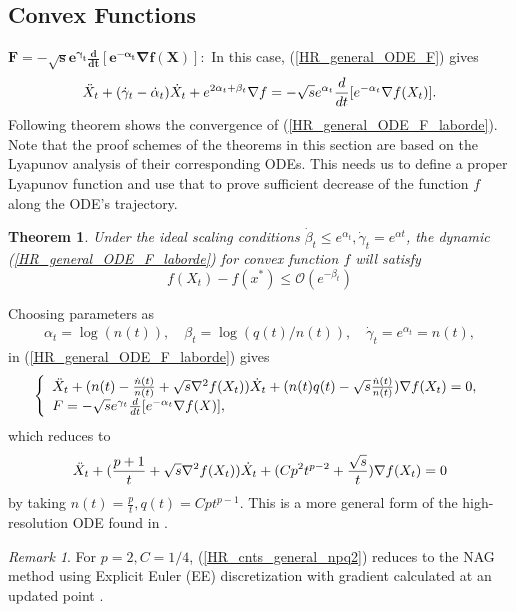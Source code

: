 \documentclass{article}
\theoremstyle{plain}
\newtheorem{theorem}{Theorem}[section]
\theoremstyle{definition}
\theoremstyle{remark}
\newtheorem{remark}{Remark}[theorem]
\begin{document}
\subsection{Convex Functions}
$\boldsymbol {F = -\sqrt{s}e^{\gamma_t}\frac{d}{dt}[e^{-\alpha_t}\nabla f(X)]}:$ 
    In this case, (\ref{HR_general_ODE_F}) gives
    \begin{align}\label{HR_general_ODE_F_laborde}
    \Ddot{X}_t + (\dot{\gamma}_t-\dot{\alpha}_t)\dot{X}_t+e^{2\alpha_t+\beta_t}\nabla f = -\sqrt{s}e^{\alpha_t}\frac{d}{dt}[e^{-\alpha_t}\nabla f(X_t)].
\end{align}
Following theorem shows the convergence of (\ref{HR_general_ODE_F_laborde}). Note that the proof schemes of the theorems in this section are based on the Lyapunov analysis of their corresponding ODEs. This needs us to define a proper Lyapunov function and use that to prove sufficient decrease of the function \(f\) along the ODE's trajectory. 
\begin{theorem}\label{Theorem_ODE_laborde}
Under the ideal scaling conditions $\dot\beta_t\leq e^{\alpha_t}, \dot\gamma_t=e^{\alpha t}$, the dynamic (\ref{HR_general_ODE_F_laborde}) for convex function $f$ will satisfy 
$$f(X_t)-f(x^*)\leq \mathcal{O}(e^{-\beta_t})$$
\end{theorem}

Choosing parameters as
\begin{align}\label{prams_general}
        \alpha_t=\log (n(t)),\quad
    \beta_t=\log (q(t)/n(t)),\quad
    \dot\gamma_t=e^{\alpha_t}=n(t),
\end{align}
in (\ref{HR_general_ODE_F_laborde}) gives
\begin{align}\label{HR_cnts_general_npq_laborde}
\left\{
\begin{array}{l}
     \Ddot{X}_t + (n(t)-\frac{\dot n(t)}{n(t)}+\sqrt{s}\nabla^2 f(X_t))\dot{X}_t+(n(t)q(t)-\sqrt{s} \frac{\dot n(t)}{n(t)})\nabla f(X_t)=0,   \\
    F = -\sqrt{s}e^{\gamma_t}\frac{d}{dt}[e^{-\alpha_t}\nabla f(X)],  
\end{array}\right.
\end{align}
which reduces to 
\begin{align}\label{HR_cnts_general_npq2}
     \Ddot{X}_t + (\frac{p+1}{t}+\sqrt{s}\nabla^2 f(X_t))\dot{X}_t+(Cp^2t^{p-2}+\frac{\sqrt{s}}{t})\nabla f(X_t)=0
\end{align}
by taking $n(t)=\frac{p}{t},q(t)=Cpt^{p-1}$. This is a more general form of the high-resolution ODE found in \citep{pmlr-v108-laborde20a}. 
\begin{remark}
For \(p=2,C=1/4\), (\ref{HR_cnts_general_npq2}) reduces to the NAG method using Explicit Euler (EE) discretization with gradient calculated at an updated point \cite{pmlr-v108-laborde20a}.
\end{remark}
\end{document}

